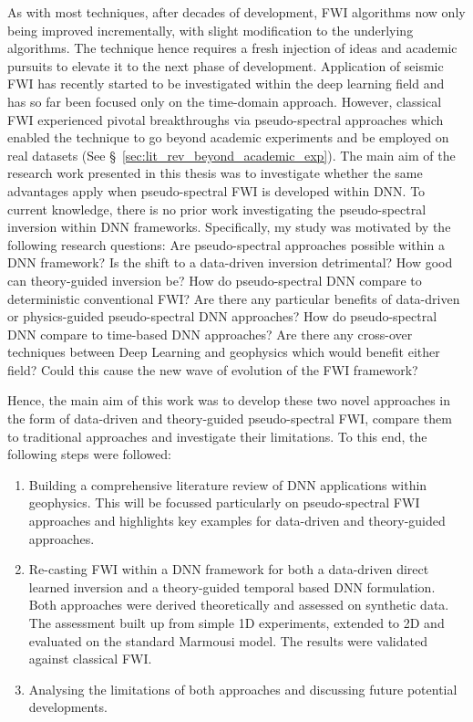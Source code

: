 As with most techniques, after decades of development, FWI algorithms now only being improved incrementally, with slight modification to the underlying algorithms. The technique hence requires a fresh injection of ideas and academic pursuits to elevate it to the next phase of development. Application of seismic FWI has recently started to be investigated within the deep learning field and has so far been focused only on the time-domain approach. However, classical FWI experienced pivotal breakthroughs via pseudo-spectral approaches which enabled the technique to go beyond academic experiments and be employed on real datasets (See §~\ref{sec:lit_rev_beyond_academic_exp}). The main aim of the research work presented in this thesis was to investigate whether the same advantages apply when pseudo-spectral FWI is developed within DNN. To current knowledge, there is no prior work investigating the pseudo-spectral inversion within \ac{DNN} frameworks. Specifically, my study was motivated by the following research questions: Are pseudo-spectral approaches possible within a \ac{DNN} framework? Is the shift to a data-driven inversion detrimental? How good can theory-guided inversion be? How do pseudo-spectral DNN compare to deterministic conventional FWI? Are there any particular benefits of data-driven or physics-guided pseudo-spectral DNN approaches? How do pseudo-spectral DNN compare to time-based DNN approaches? Are there any cross-over techniques between Deep Learning and geophysics which would benefit either field? Could this cause the new wave of evolution of the FWI framework?

Hence, the main aim of this work was to develop these two novel approaches in the form of data-driven and theory-guided pseudo-spectral FWI, compare them to traditional approaches and investigate their limitations. To this end, the following steps were followed:
\begin{enumerate}
    \item Building a comprehensive literature review of \ac{DNN} applications within geophysics. This will be focussed particularly on pseudo-spectral FWI approaches and highlights key examples for data-driven and theory-guided approaches.
    \item Re-casting FWI within a \ac{DNN} framework for both a data-driven direct learned inversion and a theory-guided temporal based \ac{DNN} formulation. Both approaches were derived theoretically and assessed on synthetic data. The assessment built up from simple 1D experiments, extended to 2D and evaluated on the standard Marmousi model. The results were validated against classical FWI.
    \item Analysing the limitations of both approaches and discussing future potential developments.
\end{enumerate}

